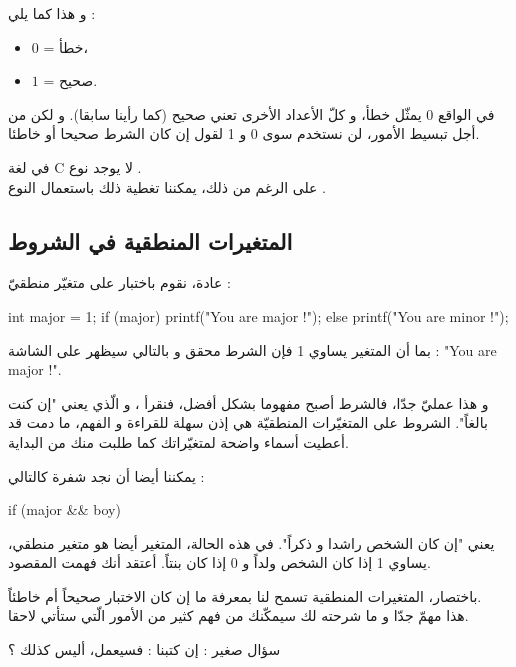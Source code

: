 و هذا كما يلي :

\begin{itemize}
	\item $ 0 $ = خطأ،
	\item $ 1 $ = صحيح.
\end{itemize}

في الواقع 0 يمثّل خطأ، و كلّ الأعداد الأخرى تعني صحيح (كما رأينا سابقا). و لكن من أجل تبسيط الأمور، لن نستخدم سوى 0 و 1 لقول إن كان الشرط صحيحا أو خاطئا.

في لغة
\textenglish{C}
 لا يوجد نوع
.\\
على الرغم من ذلك، يمكننا تغطية ذلك باستعمال النوع
.

\subsection{المتغيرات المنطقية في الشروط}

عادة، نقوم باختبار
على متغيّر منطقيّ :

\begin{Csource}
int major = 1;
if (major)
{
	printf("You are major !");
}
else {
	printf("You are minor !");
}
\end{Csource}

بما أن المتغير
يساوي 1 فإن الشرط محقق و بالتالي سيظهر على الشاشة :
"\textenglish{You are major !}".

و هذا عمليّ جدّا، فالشرط أصبح مفهوما بشكل أفضل، فنقرأ
،
و الّذي يعني "إن كنت بالغاً". الشروط على المتغيّرات المنطقيّة هي إذن سهلة للقراءة و الفهم، ما دمت قد أعطيت أسماء واضحة لمتغيّراتك كما طلبت منك من البداية.

يمكننا أيضا أن نجد شفرة كالتالي :

\begin{Csource}
if (major && boy)
\end{Csource}

يعني "إن كان الشخص راشدا و ذكراً". في هذه الحالة، المتغير 
أيضا هو متغير منطقي، يساوي 1 إذا كان الشخص ولداً و 0 إذا كان بنتاً. أعتقد أنك فهمت المقصود.

باختصار، المتغيرات المنطقية تسمح لنا بمعرفة ما إن كان الاختبار صحيحاً أم خاطئاً.\\
هذا مهمّ جدّا و ما شرحته لك سيمكّنك من فهم كثير من الأمور الّتي ستأتي لاحقا.

\begin{question}
سؤال صغير : إن كتبنا :
فسيعمل، أليس كذلك ؟
\end{question}

